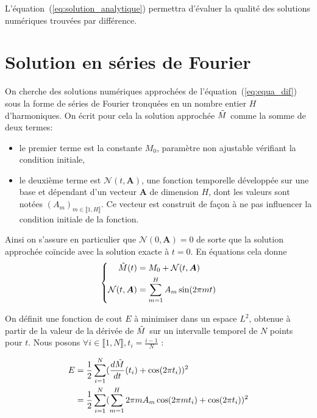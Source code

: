 \documentclass[12pt]{report}
\begin{document}
L'équation~(\ref{eq:solution_analytique}) permettra d'évaluer la qualité des solutions numériques trouvées par différence.

\section{Solution en séries de Fourier}
\label{sec:sol_ser_fourier_1d}

On cherche des solutions numériques approchées de l'équation~(\ref{eq:equa_dif}) sous la forme de séries de Fourier tronquées en un nombre entier $H$ d'harmoniques.
On écrit pour cela la solution approchée $\Tilde{M}$ comme la somme de deux termes: 
\begin{itemize}
    \item le premier terme est la constante $M_0$, paramètre non ajustable vérifiant la condition initiale,
    \item le deuxième terme est $\mathcal{N}(t,\bm{A})$, une fonction temporelle développée sur une base et dépendant d'un vecteur ${\bm A}$ de dimension $H$, dont les valeurs sont notées $(A_m)_{m\in \llbracket 1,H \rrbracket}$.
    Ce vecteur est construit de façon à ne pas influencer la condition initiale de la fonction.
\end{itemize}
Ainsi on s'assure en particulier que $\mathcal{N}(0,\bm{A})=0$ de sorte que la solution approchée coïncide avec la solution exacte à $t=0$. 
En équations cela donne
\begin{equation}
    \left\{
    \begin{aligned}
        \Tilde{M}(t)            & = M_0 + {\mathcal{N}}(t,\bm{A})     \\
        {\mathcal{N}}(t,\bm{A}) & = \sum_{m=1}^{H} A_m \sin(2\pi m t)
    \end{aligned}
    \right.
    \label{eq:solution_fourier}
\end{equation}

On définit une fonction de cout $E$ à minimiser dans un espace $L^2$, obtenue à partir de la valeur de la dérivée de $\Tilde{M}$ sur un intervalle temporel de $N$ points pour $t$. 
Nous posons $\forall i \in\llbracket 1,N \rrbracket, t_i = \frac{i-1}{N} $ :

\begin{equation}
    \begin{aligned}
        E & = \frac{1}{2}\sum_{i=1}^{N} (\frac{d\Tilde{M}}{dt}(t_i) +\cos(2\pi t_i))^2               \\
          & = \frac{1}{2}\sum_{i=1}^{N}(\sum_{m=1}^{H} 2\pi m A_m \cos(2\pi m t_i)+\cos(2\pi t_i))^2
    \end{aligned}
    \label{eq:fonction_erreur}
\end{equation}
\end{document}
